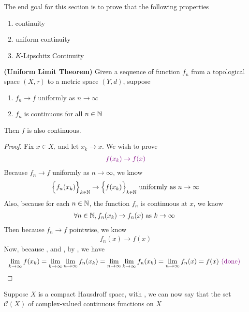 \documentclass{report}
\begin{document}
\label{UCaCH}
\begin{mdframed}
The end goal for this section is to prove that the following properties 
\begin{enumerate}[label=(\alph*)]
  \item continuity 
  \item uniform continuity 
  \item $K$-Lipschitz Continuity 
\end{enumerate}
\end{mdframed}
\begin{theorem}
\label{ULT}
\textbf{(Uniform Limit Theorem)} Given a sequence of function $f_n$ from a topological space $(X,\tau)$ to a metric space $(Y,d)$, suppose 
\begin{enumerate}[label=(\alph*)]
  \item $f_n\to f$ uniformly as $n\to \infty$
  \item $f_n$ is continuous for all  $n\in\mathbb{N}$ 
\end{enumerate}
Then $f$ is also continuous. 
\end{theorem}
\begin{proof}
Fix $x \in X$, and let $x_k\to x$. We wish to prove
\begin{align*}
  \textcolor{violet}{f(x_k)\to f(x)}
\end{align*}
Because $f_n\to f$ uniformly as $n\to \infty$, we know 
\begin{align}
\label{282e1}
\Big\{ f_n(x_k) \Big\}_{k\in\mathbb{N}}\to \Big\{ f(x_k) \Big\}_{k\in\mathbb{N}}\text{ uniformly as }n\to \infty
\end{align}
Also, because for each $n\in\mathbb{N}$, the function $f_n$ is continuous at $x$, we know 
\begin{align}
\label{282e2}
\forall n\in\mathbb{N}, f_n(x_k)\to f_n(x)\text{ as $k\to \infty$ }
\end{align}
Then because $f_n\to f$ pointwise, we know 
\begin{align}
\label{282e3}
f_n(x)\to f(x)
\end{align}
Now, because ,   and  , by , we have
\begin{align*}
\lim_{k\to \infty}f(x_k)=\lim_{k\to \infty}\lim_{n\to \infty}f_n(x_k)=\lim_{n\to \infty}\lim_{k\to \infty}f_n(x_k)=\lim_{n\to \infty}f_n(x)=f(x)\textcolor{violet}{\text{ (done) }}
\end{align*}
\end{proof}
\begin{mdframed}
Suppose $X$ is a compact Hausdroff space,  with , we can now say that the set $\mathcal{C}(X)$ of complex-valued continuous functions on $X$ 
\end{mdframed}
\end{document}
